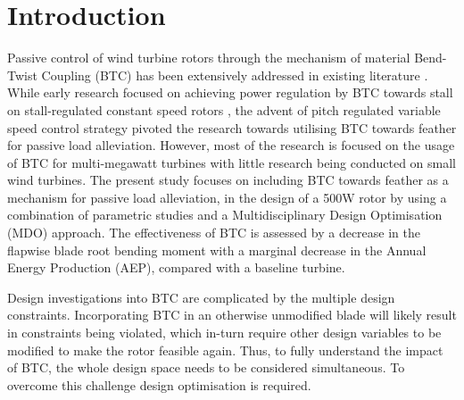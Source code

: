 \documentclass[a4paper]{jpconf}
\begin{document}
\section{Introduction}
\label{sec:intro}
Passive control of wind turbine rotors through the mechanism of material Bend-Twist Coupling (BTC) has been extensively addressed in existing literature \cite{veers1998aeroelastic}. %
While early research focused on achieving power regulation by BTC towards stall on stall-regulated constant speed rotors 
, the advent of pitch regulated variable speed control strategy pivoted the research towards utilising BTC towards feather for passive load alleviation. %
However, most of the research is focused on the usage of BTC for multi-megawatt turbines with little research being conducted on small wind turbines. The present study focuses on including BTC towards feather as a mechanism for passive load alleviation, in the design of a 500W rotor by using a combination of parametric studies and a Multidisciplinary Design Optimisation (MDO) approach. The effectiveness of BTC is assessed by a decrease in the flapwise blade root bending moment with a marginal decrease in the Annual Energy Production (AEP), compared with a baseline turbine.

Design investigations into BTC are complicated by the multiple design constraints. Incorporating BTC in an otherwise unmodified blade will likely result in constraints being violated, which in-turn require other design variables to be modified to make the rotor feasible again. Thus, to fully understand the impact of BTC, the whole design space needs to be considered simultaneous. To overcome this challenge design optimisation is required.
\end{document}
